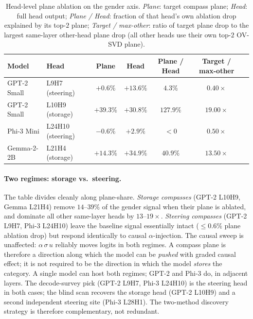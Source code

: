 \begin{table}[h]
\centering
\small
\caption{Head-level plane ablation on the gender axis. \emph{Plane}: target
compass plane; \emph{Head}: full head output; \emph{Plane / Head}:
fraction of that head's own ablation drop explained by its top-$2$
plane; \emph{Target / max-other}: ratio of target plane drop to the
largest same-layer other-head plane drop (all other heads use
their own top-$2$ OV-SVD plane).}
\label{tab:headshare}
\begin{tabular}{llccccc}
\toprule
Model & Head & Plane & Head & Plane / Head & Target / max-other \\
\midrule
GPT-2 Small & L9H7 (steering) & $+0.6\%$ & $+13.6\%$ & $4.3\%$  & $0.40\times$ \\
GPT-2 Small & L10H9 (storage) & $+39.3\%$ & $+30.8\%$ & $127.9\%$ & $19.00\times$ \\
Phi-3 Mini  & L24H10 (steering) & $-0.6\%$ & $+2.9\%$  & $<0$     & $0.50\times$ \\
Gemma-2-2B  & L21H4 (storage)  & $+14.3\%$ & $+34.9\%$ & $40.9\%$ & $13.50\times$ \\
\bottomrule
\end{tabular}
\end{table}

\paragraph{Two regimes: storage vs.\ steering.} The table divides
cleanly along plane-share. \emph{Storage compasses} (GPT-2 L10H9,
Gemma L21H4) remove $14$--$39\%$ of the gender signal when their plane
is ablated, and dominate all other same-layer heads by
$13$--$19\times$. \emph{Steering compasses} (GPT-2 L9H7, Phi-3 L24H10)
leave the baseline signal essentially intact ($\le 0.6\%$ plane
ablation drop) but respond identically to causal $\alpha$-injection.
The causal sweep is unaffected: $\alpha\,\sigma\,u$ reliably moves
logits in both regimes. A compass plane is therefore a direction
along which the model can be \emph{pushed} with graded causal effect;
it is not required to be the direction in which the model \emph{stores}
the category. A single model can host both regimes; GPT-2 and Phi-3
do, in adjacent layers. The decode-survey pick (GPT-2 L9H7, Phi-3
L24H10) is the steering head in both cases; the blind scan recovers
the storage head (GPT-2 L10H9) and a second independent steering site
(Phi-3 L28H1). The two-method discovery strategy is therefore
complementary, not redundant.

